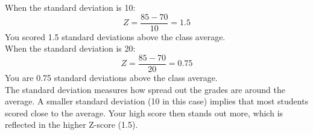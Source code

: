 \documentclass{./../../Latex/handout}
\begin{document}
\begin{enumerate}
When the standard deviation is 10:
$$ Z = \frac{85-70}{10} = 1.5   $$
You scored 1.5 standard deviations above the class average. \\

When the standard deviation is 20:
$$ Z = \frac{85-70}{20} = 0.75   $$
You are 0.75 standard deviations above the class average. \\

The standard deviation measures how spread out the grades are around the average. A smaller standard deviation (10 in this case) implies that most students scored close to the average. Your high score then stands out more, which is reflected in the higher Z-score (1.5).
\end{enumerate}
\end{document}
